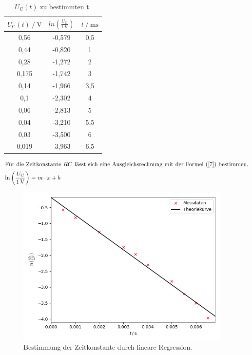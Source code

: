 \begin{table}[H] 
    \centering
    \caption{$U_{\text{C}}(t)$ zu bestimmten t.} 
    \label{Tabelle1}
    \begin{tabular} {c  c  c }
        \toprule
        {$ U_{\text{C}}(t) \mathbin{/} \unit{\volt} $} &
        {$ ln \left(\frac{U_{\text{C}}}{1\,\unit{\volt}}\right) $} &
        {$ t \mathbin{/} \unit{\milli\second} $} \\
        \midrule
        0,56  & -0,579 & 0,5 \\
        0,44  & -0,820 & 1   \\
        0,28  & -1,272 & 2   \\
        0,175 & -1,742 & 3   \\
        0,14  & -1,966 & 3,5 \\
        0,1   & -2,302 & 4   \\
        0,06  & -2,813 & 5   \\
        0,04  & -3,210 & 5,5 \\
        0,03  & -3,500 & 6   \\
        0,019 & -3,963 & 6,5 \\
        \bottomrule
    \end{tabular} 
\end{table} 

\begin{align}
    \intertext{Für die Zeitkonstante $RC$ lässt sich eine Ausgleichsrechnung mit der Formel (\ref{7}) bestimmen.}
    \ln \left(\frac{U_{\text{C}}}{1\,\unit{\volt}}\right) = m \cdot x + b \label{8}
\end{align}

\begin{figure}[H]    
    \centering
    \includegraphics[height=80mm]{bilder/Entladevorgang.png}
    \caption{Bestimmung der Zeitkonstante durch lineare Regression.\label{Abbildung4} }
\end{figure}

